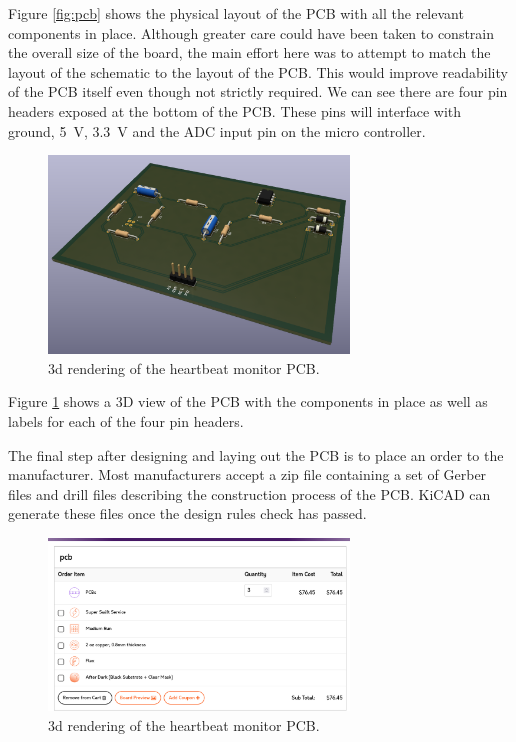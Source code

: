 \documentclass[CMPE]{../KGCOEReport}
\begin{document}
	Figure \ref{fig:pcb} shows the physical layout of the PCB with all the
	relevant components in place. Although greater care could have been taken to
	constrain the overall size of the board, the main effort here was to attempt
	to match the layout of the schematic to the layout of the PCB. This would
	improve readability of the PCB itself even though not strictly required.
	We can see there are four pin headers exposed at the bottom of the PCB.
	These pins will interface with ground, \SI{5}{\volt}, \SI{3.3}{\volt} and
	the ADC input pin on the micro controller.

	\begin{figure}[h!]
        \centering
        \includegraphics[width=8cm]{pcb_3d}
        \caption{3d rendering of the heartbeat monitor PCB.}
        \label{fig:pcb_3d}
	\end{figure}

	Figure \ref{fig:pcb_3d} shows a 3D view of the PCB with the components in place
	as well as labels for each of the four pin headers.

	\pagebreak

	The final step after designing and laying out the PCB is to place an order to
	the manufacturer. Most manufacturers accept a zip file containing a set of Gerber
	files and drill files describing the construction process of the PCB. KiCAD can
	generate these files once the design rules check has passed.

	\begin{figure}[h!]
        \centering
        \includegraphics[width=8cm]{osh}
        \caption{3d rendering of the heartbeat monitor PCB.}
        \label{fig:osh}
	\end{figure}
\end{document}
